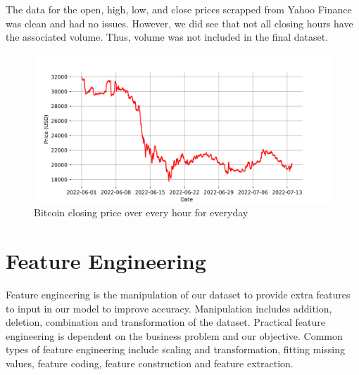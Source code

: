 \noindent The data for the open, high, low, and close prices scrapped from Yahoo Finance was clean and had no issues. However, we did see that not all closing hours have the associated volume. Thus, volume was not included in the final dataset.
\begin{figure}[H]
    \centering
    \includegraphics[scale=0.73]{CHAPTER_5/bitcoin_price_python.png}
    \caption{Bitcoin closing price over every hour for everyday}
    \label{bitcoin_price}
 \end{figure}
\section{Feature Engineering}
Feature engineering is the manipulation of our dataset to provide extra features to input in our model to improve accuracy. Manipulation includes addition, deletion, combination and transformation of the dataset. Practical feature engineering is dependent on the business problem and our objective. Common types of feature engineering include scaling and transformation, fitting missing values, feature coding, feature construction and feature extraction. 
